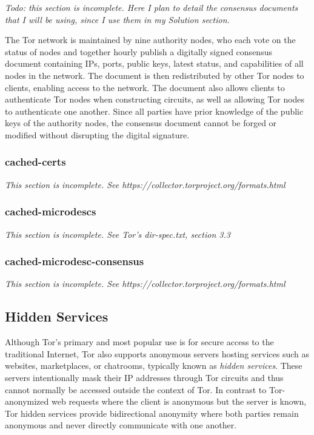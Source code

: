 \emph{Todo: this section is incomplete. Here I plan to detail the consensus documents that I will be using, since I use them in my Solution section.}

The Tor network is maintained by nine authority nodes, who each vote on the status of nodes and together hourly publish a digitally signed consensus document containing IPs, ports, public keys, latest status, and capabilities of all nodes in the network. The document is then redistributed by other Tor nodes to clients, enabling access to the network. The document also allows clients to authenticate Tor nodes when constructing circuits, as well as allowing Tor nodes to authenticate one another. Since all parties have prior knowledge of the public keys of the authority nodes, the consensus document cannot be forged or modified without disrupting the digital signature.\cite{xin2009design}

\subsubsection{cached-certs}

\emph{This section is incomplete. See https://collector.torproject.org/formats.html}

\subsubsection{cached-microdescs}

\emph{This section is incomplete. See Tor's dir-spec.txt, section 3.3}

\subsubsection{cached-microdesc-consensus}

\emph{This section is incomplete. See https://collector.torproject.org/formats.html}

\subsection{Hidden Services}
\label{sec:HiddenServices}

Although Tor's primary and most popular use is for secure access to the traditional Internet, Tor also supports anonymous servers hosting services such as websites, marketplaces, or chatrooms, typically known as \emph{hidden services}. These servers intentionally mask their IP addresses through Tor circuits and thus cannot normally be accessed outside the context of Tor. In contrast to Tor-anonymized web requests where the client is anonymous but the server is known, Tor hidden services provide bidirectional anonymity where both parties remain anonymous and never directly communicate with one another.\cite{nicolussi2011human}

